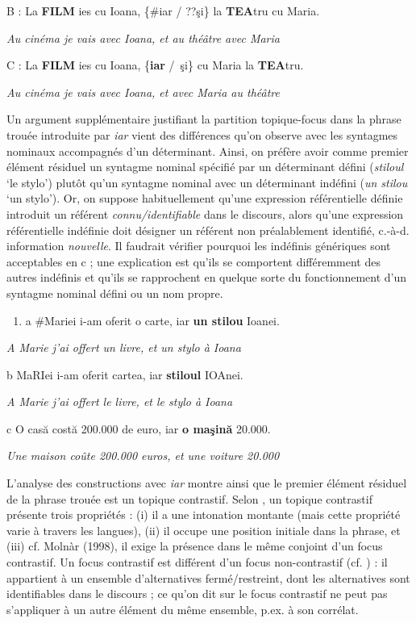   B :  La \textbf{FILM} ies cu Ioana, \{\#iar / ??şi\} la \textbf{TEA}tru cu Maria. 

{\itshape
Au cinéma je vais avec Ioana, et au théâtre avec Maria}

  C :  La \textbf{FILM} ies cu Ioana, \{\textbf{iar} /~şi\} cu Maria la \textbf{TEA}tru. 

{\itshape
    Au cinéma je vais avec Ioana, et avec Maria au théâtre } 

Un argument supplémentaire justifiant la partition topique-focus dans la phrase trouée introduite par \textit{iar} vient des différences qu'on observe avec les syntagmes nominaux accompagnés d'un déterminant. Ainsi, on préfère avoir comme premier élément résiduel un syntagme nominal spécifié par un déterminant défini (\textit{stiloul} `le stylo') plutôt qu'un syntagme nominal avec un déterminant indéfini (\textit{un stilou} `un stylo'). Or, on suppose habituellement qu'une expression référentielle définie introduit un référent \textit{connu/identifiable} dans le discours, alors qu'une expression référentielle indéfinie doit désigner un référent non préalablement identifié, c.-à-d. information \textit{nouvelle}. Il faudrait vérifier pourquoi les indéfinis génériques sont acceptables en c ; une explication est qu'ils se comportent différemment des autres indéfinis et qu'ils se rapprochent en quelque sorte du fonctionnement d'un syntagme nominal défini ou un nom propre. 


\begin{enumerate}
\item \label{bkm:Ref289685475}a  \#Mariei i-am oferit o carte, iar \textbf{un stilou} Ioanei.


\end{enumerate}
{\itshape
A Marie j'ai offert un livre, et un stylo à Ioana } 

  b  MaRIei i-am oferit cartea, iar \textbf{stiloul} IOAnei. 

{\itshape
A Marie j'ai offert le livre, et le stylo à Ioana } 

  c  O casă costă 200.000 de euro, iar \textbf{o maşină} 20.000. 

{\itshape
Une maison coûte 200.000 euros, et une voiture 20.000 } 

L'analyse des constructions avec \textit{iar} montre ainsi que le premier élément résiduel de la phrase trouée est un topique contrastif. Selon \citet{Winkler2005}, un topique contrastif présente trois propriétés : (i) il a une intonation montante (mais cette propriété varie à travers les langues), (ii) il occupe une position initiale dans la phrase, et (iii) cf. Molnàr (1998), il exige la présence dans le même conjoint d'un focus contrastif. Un focus contrastif est différent d'un focus non-contrastif (cf. \citet{Repp2010}) : il appartient à un ensemble d'alternatives fermé/restreint, dont les alternatives sont identifiables dans le discours ; ce qu'on dit sur le focus contrastif ne peut pas s'appliquer à un autre élément du même ensemble, p.ex. à son corrélat.

